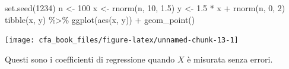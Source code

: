 \documentclass[
  11pt,
]{krantz}
\makeatletter
\newenvironment{Shaded}{\begin{snugshade}}{\end{snugshade}}
\newcommand{\AttributeTok}[1]{\textcolor[rgb]{0.61,0.61,0.61}{#1}}
\newcommand{\CommentTok}[1]{\textcolor[rgb]{0.37,0.37,0.37}{\textit{#1}}}
\newcommand{\DecValTok}[1]{\textcolor[rgb]{0.06,0.06,0.06}{#1}}
\newcommand{\FloatTok}[1]{\textcolor[rgb]{0.06,0.06,0.06}{#1}}
\newcommand{\FunctionTok}[1]{\textcolor[rgb]{0,0,0}{#1}}
\newcommand{\NormalTok}[1]{#1}
\newcommand{\OtherTok}[1]{\textcolor[rgb]{0.37,0.37,0.37}{#1}}
\newcommand{\SpecialCharTok}[1]{\textcolor[rgb]{0,0,0}{#1}}
\newenvironment{kframe}{%
\medskip{}
\setlength{\fboxsep}{.8em}
 \def\at@end@of@kframe{}%
 \ifinner\ifhmode%
  \def\at@end@of@kframe{\end{minipage}}%
  \begin{minipage}{\columnwidth}%
 \fi\fi%
 \def\FrameCommand##1{\hskip\@totalleftmargin \hskip-\fboxsep
 \colorbox{shadecolor}{##1}\hskip-\fboxsep
     \hskip-\linewidth \hskip-\@totalleftmargin \hskip\columnwidth}%
 \MakeFramed {\advance\hsize-\width
   \@totalleftmargin\z@ \linewidth\hsize
   \@setminipage}}%
 {\par\unskip\endMakeFramed%
 \at@end@of@kframe}
\renewenvironment{Shaded}{\begin{kframe}}{\end{kframe}}
\makeatother
\begin{document}
\begin{Shaded}
\begin{Highlighting}[]
\FunctionTok{set.seed}\NormalTok{(}\DecValTok{1234}\NormalTok{)}
\NormalTok{n }\OtherTok{\textless{}{-}} \DecValTok{100}
\NormalTok{x }\OtherTok{\textless{}{-}} \FunctionTok{rnorm}\NormalTok{(n, }\DecValTok{10}\NormalTok{, }\FloatTok{1.5}\NormalTok{)}
\NormalTok{y }\OtherTok{\textless{}{-}} \FloatTok{1.5} \SpecialCharTok{*}\NormalTok{ x }\SpecialCharTok{+} \FunctionTok{rnorm}\NormalTok{(n, }\DecValTok{0}\NormalTok{, }\DecValTok{2}\NormalTok{)}
\FunctionTok{tibble}\NormalTok{(x, y) }\SpecialCharTok{\%\textgreater{}\%}
  \FunctionTok{ggplot}\NormalTok{(}\FunctionTok{aes}\NormalTok{(x, y)) }\SpecialCharTok{+}
  \FunctionTok{geom\_point}\NormalTok{()}
\end{Highlighting}
\end{Shaded}

\begin{center}\texttt{[image: cfa\_book\_files/figure-latex/unnamed-chunk-13-1]} \end{center}

\begin{Shaded}
\end{Shaded}

Questi sono i coefficienti di regressione quando \(X\) è misurata senza errori.

\begin{Shaded}
\end{Shaded}
\end{document}
